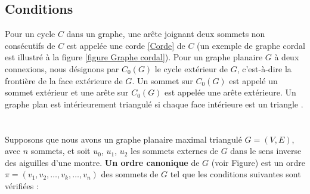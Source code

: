 \documentclass[hidelinks,letterpaper,12pt]{article}
\begin{document}
\begin{figure}[H]
\begin{tikzpicture}[scale=.7]
\end{tikzpicture}
\label{Ordre canonique d'un graphe planaire maximal.}	
\end{figure}


\subsection{Conditions}
\label{Conditions}
Pour un cycle $C$ dans un graphe, une arête joignant deux sommets non consécutifs de $C$ est appelée une corde \ref{Corde} de $C$ (un exemple de graphe cordal est illustré à la figure \ref{figure Graphe cordal}). Pour un graphe planaire $G$ à deux connexions, nous désignons par $C_0(G)$ le cycle extérieur de $G$, c'est-à-dire la frontière de la face extérieure de $G$. Un sommet sur $C_0(G)$ est appelé un sommet extérieur et une arête sur $C_0(G)$ est appelée une arête extérieure. Un graphe plan est intérieurement triangulé si chaque face intérieure est un triangle \citep{TakaoSaidur}.
\\ \\ \\
Supposons que nous avons un graphe planaire maximal triangulé \(G=(V,E) \), avec $n$ sommets, et soit $u_0$, $u_1$, $u_2$ les sommets externes de $G$ dans le sens inverse des aiguilles d'une montre. \textbf{Un ordre canonique} de $G$ (voir Figure) est un ordre \(\pi=(v_{1}, v_{2}, \ldots ,v_k, \ldots ,v_{n}) \) des sommets de $G$ tel que les conditions suivantes sont vérifiées :
\\ \\
\end{document}
